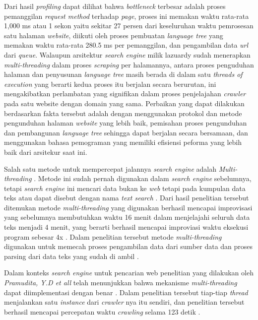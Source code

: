 Dari hasil \emph{profiling} dapat dilihat bahwa \emph{bottleneck} terbesar adalah proses pemanggilan \emph{request method} terhadap \emph{page}, proses ini memakan waktu rata-rata 1,000 ms atau 1 sekon yaitu sekitar 27 persen dari keseluruhan waktu pemrosesan satu halaman \emph{website}, diikuti oleh proses pembuatan \emph{language tree} yang memakan waktu rata-rata 280.5 ms per pemanggilan, dan pengambilan data \emph{url} dari \emph{queue}. Walaupun arsitektur \emph{search engine} milik lazuardy sudah menerapkan \emph{multi-threading} dalam proses \emph{scraping} per halamannya, antara proses penguduhan halaman dan penyusunan \emph{language tree} masih berada di dalam satu \emph{threads of execution} yang berarti kedua proses itu berjalan secara berurutan, ini mengakibatkan perlambatan yang signifikan dalam proses penjelajahan \emph{crawler} pada satu website dengan domain yang sama. Perbaikan yang dapat dilakukan berdasarkan fakta tersebut adalah dengan menggunakan protokol dan metode pengunduhan halaman \emph{website} yang lebih baik, pemisahan proses pengunduhan dan pembangunan \emph{language tree} sehingga dapat berjalan secara bersamaan, dan menggunakan bahasa pemograman yang memiliki efisiensi peforma yang lebih baik dari arsitekur saat ini.

Salah satu metode untuk mempercepat jalannya \emph{search engine} adalah \emph{Multi-threading} \citep{multithreadedtextsearch}. Metode ini sudah pernah digunakan dalam \emph{search engine} sebelumnya, tetapi \emph{search engine} ini mencari data bukan ke \emph{web} tetapi pada kumpulan data teks atau dapat disebut dengan nama \emph{text search} \citep{multithreadedtextsearch}. Dari hasil penelitian tersebut ditemukan metode \emph{multi-threading} yang digunakan berhasil mencapai improvisasi yang sebelumnya membutuhkan waktu 16 menit dalam menjelajahi seluruh data teks menjadi 4 menit, yang berarti berhasil mencapai improviasi waktu eksekusi program sebesar 4x \citep{multithreadedtextsearch}. Dalam penelitian tersebut metode \emph{multi-threading} digunakan untuk memecah proses pengambilan data dari sumber data dan proses parsing dari data teks yang sudah di ambil \citep{multithreadedtextsearch}.

Dalam konteks \emph{search engine} untuk pencarian web penelitian yang dilakukan oleh \emph{Pramudita, Y.D et all} telah menunjukkan bahwa mekanisme \emph{multi-threading} dapat diimplementasi dengan benar \citep{Pramudita_2020}. Dalam penelitian tersebut tiap-tiap \emph{thread} menjalankan satu \emph{instance} dari \emph{crawler} nya itu sendiri, dan penelitian tersebut berhasil mencapai percepatan waktu \emph{crawling} selama 123 detik \citep{Pramudita_2020}.

